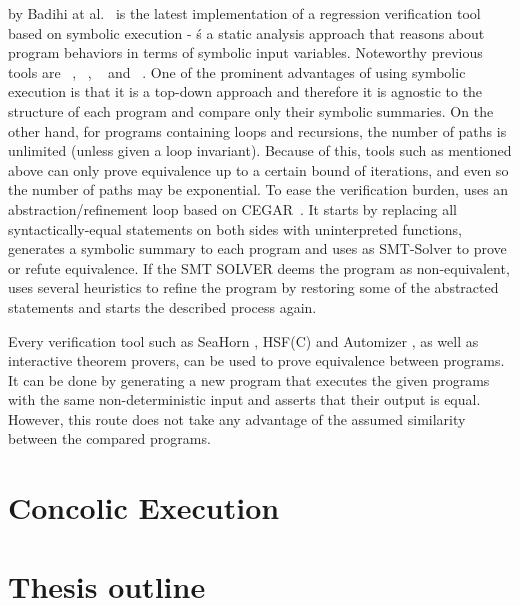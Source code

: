  by Badihi at al.~\cite{10.1145/3368089.3409757} is the latest implementation of a regression verification tool based on symbolic execution - ś a static analysis approach that reasons about program behaviors in terms of symbolic input variables. Noteworthy previous tools are ~\cite{10.1145/3238147.3238178}, ~\cite{10.1007/978-3-319-66706-5_20}, ~\cite{inproceedings} and ~\cite{10.1145/1453101.1453131}. One of the prominent advantages of using symbolic execution is that it is a top-down approach and therefore it is agnostic to the structure of each program and compare only their symbolic summaries. On the other hand, for programs containing loops and recursions, the number of paths is unlimited (unless given a loop invariant). Because of this, tools such as mentioned above can only prove equivalence up to a certain bound of iterations, and even so the number of paths may be exponential. To ease the verification burden,  uses an abstraction/refinement loop based on CEGAR~\cite{10.1007/10722167_15}. It starts by replacing all syntactically-equal statements on both sides with uninterpreted functions, generates a symbolic summary to each program and uses as SMT-Solver to prove or refute equivalence. If the SMT SOLVER deems the program as non-equivalent,  uses several heuristics to refine the program by restoring some of the abstracted statements and starts the described process again.


Every verification tool such as SeaHorn \cite{DBLP:conf/cav/GurfinkelKKN15}, HSF(C) \cite{DBLP:conf/tacas/GrebenshchikovGLPR12} and Automizer \cite{DBLP:conf/cav/HeizmannHP13}, as well as interactive theorem provers, can be used to prove equivalence between programs. It can be done by generating a new program that executes the given programs with the same non-deterministic input and asserts that their output is equal. However, this route does not take any advantage of the assumed similarity between the compared programs.

\section{Concolic Execution}

\section{Thesis outline}
